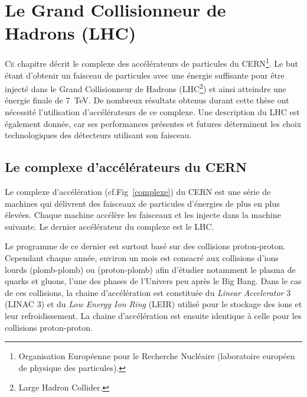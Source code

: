 \chapter{Le Grand Collisionneur de Hadrons (LHC)}
\renewcommand\chapterillustration{LHC/lhc}
\ThisULCornerWallPaper{1}{\chapterillustration}
\minitoc
\lettrine[lines=4, slope=-0.5em]{C}{e} chapitre décrit le complexe des accélérateurs de particules du CERN\footnote{Organisation Européenne pour le Recherche Nucléaire (laboratoire européen de physique des particules).}. Le but étant d'obtenir un faisceau de particules avec une énergie suffisante pour être injecté dans le Grand Collisionneur de Hadrons (LHC\footnote{Large Hadron Collider.}) et ainsi atteindre une énergie finale de \SI{7}{\tera\eV}. De nombreux résultats obtenus durant cette thèse ont nécessité l'utilisation d'accélérateurs de ce complexe. Une description du LHC est également donnée, car ses performances présentes et futures déterminent les choix technologiques des détecteurs utilisant son faisceau.

\section{Le complexe d'accélérateurs du CERN}

Le complexe d'accélération (cf.Fig~\ref{complexe}) du CERN est une série de machines qui délivrent des faisceaux de particules d'énergies de plus en plus élevées. Chaque machine accélère les faisceaux et les injecte dans la machine suivante. Le dernier accélérateur du complexe est le LHC.

Le programme de ce dernier est surtout basé sur des collisions proton-proton. Cependant chaque année, environ un mois est consacré aux collisions d'ions lourds (plomb-plomb) ou (proton-plomb) afin d'étudier notamment le plasma de quarks et gluons, l'une des phases de l'Univers peu après le Big Bang. Dans le cas de ces collisions, la chaine d'accélération est constituée du \textit{Linear Accelerator} \num{3} (LINAC \num{3}) et du \textit{Low Energy Ion Ring} (LEIR) utilisé pour le stockage des ions et leur refroidissement. La chaine d'accélération est ensuite identique à celle pour les collisions proton-proton.

